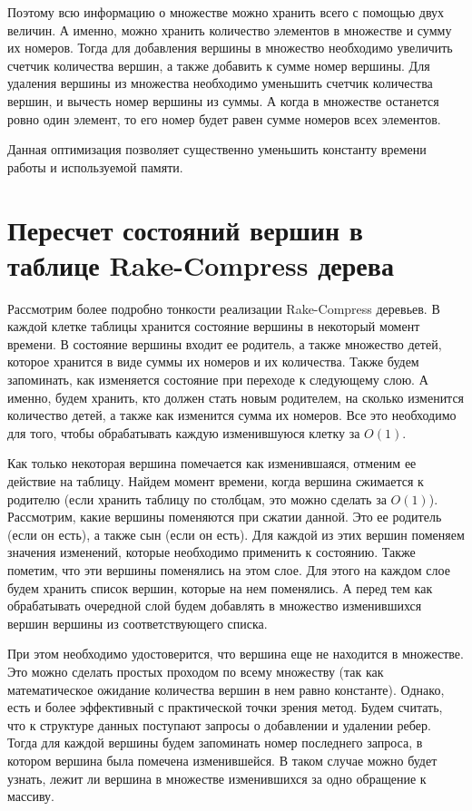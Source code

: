 Поэтому всю информацию о множестве можно хранить всего с помощью двух величин. А именно, можно хранить количество элементов в множестве и сумму их номеров. 
Тогда для добавления вершины в множество необходимо увеличить счетчик количества вершин, а также добавить к сумме номер вершины. 
Для удаления вершины из множества необходимо уменьшить счетчик количества вершин, и вычесть номер вершины из суммы. 
А когда в множестве останется ровно один элемент, то его номер будет равен сумме номеров всех элементов.

Данная оптимизация позволяет существенно уменьшить константу времени работы и используемой памяти. 

\FloatBarrier
\section{Пересчет состояний вершин в таблице Rake-Compress дерева}

Рассмотрим более подробно тонкости реализации Rake-Compress деревьев. В каждой клетке таблицы хранится состояние вершины в некоторый момент времени. 
В состояние вершины входит ее родитель, а также множество детей, которое хранится в виде суммы их номеров и их количества. Также будем запоминать, 
как изменяется состояние при переходе к следующему слою. А именно, будем хранить, кто должен стать новым родителем, на сколько изменится количество детей, а также как изменится сумма их номеров. 
Все это необходимо для того, чтобы обрабатывать каждую изменившуюся клетку за $O(1)$. 

Как только некоторая вершина помечается как изменившаяся, отменим ее действие на таблицу. 
Найдем момент времени, когда вершина сжимается к родителю (если хранить таблицу по столбцам, это можно сделать за $O(1)$).
Рассмотрим, какие вершины поменяются при сжатии данной. Это ее родитель (если он есть), а также сын (если он есть).
Для каждой из этих вершин поменяем значения изменений, которые необходимо применить к состоянию. 
Также пометим, что эти вершины поменялись на этом слое. Для этого на каждом слое будем хранить список вершин, которые на нем поменялись. 
А перед тем как обрабатывать очередной слой будем добавлять в множество изменившихся вершин вершины из соответствующего списка. 

При этом необходимо удостоверится, что вершина еще не находится в множестве. 
Это можно сделать простых проходом по всему множеству (так как математическое ожидание количества вершин в нем равно константе).
Однако, есть и более эффективный с практической точки зрения метод. Будем считать, что к структуре данных поступают запросы о добавлении и удалении ребер. 
Тогда для каждой вершины будем запоминать номер последнего запроса, в котором вершина была помечена изменившейся. 
В таком случае можно будет узнать, лежит ли вершина в множестве изменившихся за одно обращение к массиву.

